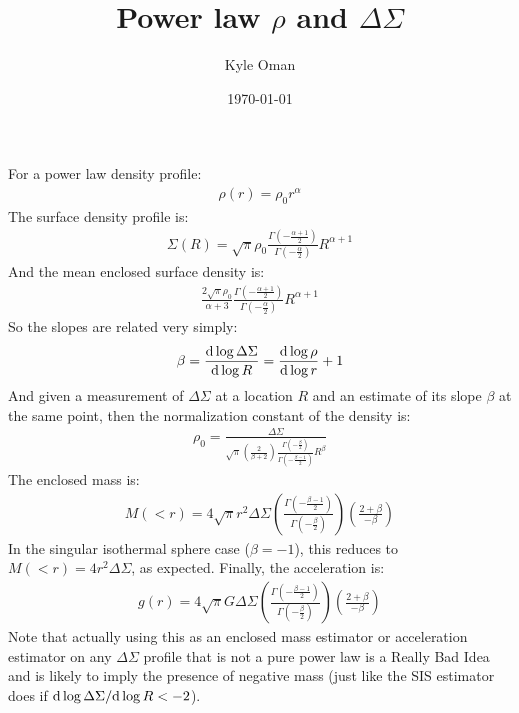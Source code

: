 \documentclass{article}
\title{Power law $\rho$ and $\Delta\Sigma$}
\author{Kyle Oman}
\date{\today}
\begin{document}
\maketitle

\noindent For a power law density profile:
\begin{align}
  \rho(r) = \rho_0 r^\alpha
\end{align}
The surface density profile is:
\begin{align}
  \Sigma(R) = \sqrt{\pi}\rho_0\frac{\Gamma\left(-\frac{\alpha+1}{2}\right)}{\Gamma\left(-\frac{\alpha}{2}\right)}R^{\alpha+1}
\end{align}
And the mean enclosed surface density is:
\begin{align}
  \frac{2\sqrt{\pi}\rho_0}{\alpha+3}\frac{\Gamma\left(-\frac{\alpha+1}{2}\right)}{\Gamma\left(-\frac{\alpha}{2}\right)}R^{\alpha+1}
\end{align}
So the slopes are related very simply:
\begin{align}
  \beta = \frac{{\rm d}\log\Delta\Sigma}{{\rm d}\log R} =  \frac{{\rm d}\log\rho}{{\rm d}\log r} + 1
\end{align}
And given a measurement of $\Delta\Sigma$ at a location $R$ and an estimate of its slope $\beta$ at the same point, then the normalization constant of the density is:
\begin{align}
  \rho_0 = \frac{\Delta\Sigma}{\sqrt{\pi}\left(\frac{2}{\beta+2}\right)\frac{\Gamma\left(-\frac{\beta}{2}\right)}{\Gamma\left(-\frac{\beta-1}{2}\right)}R^\beta}
\end{align}
The enclosed mass is:
\begin{align}
  M(<r) = 4\sqrt{\pi}r^2\Delta\Sigma\left(\frac{\Gamma\left(-\frac{\beta-1}{2}\right)}{\Gamma\left(-\frac{\beta}{2}\right)}\right)\left(\frac{2+\beta}{-\beta}\right)
\end{align}
In the singular isothermal sphere case ($\beta=-1$), this reduces to $M(<r)=4r^2\Delta\Sigma$, as expected. Finally, the acceleration is:
\begin{align}
  g(r) = 4\sqrt{\pi}G\Delta\Sigma\left(\frac{\Gamma\left(-\frac{\beta-1}{2}\right)}{\Gamma\left(-\frac{\beta}{2}\right)}\right)\left(\frac{2+\beta}{-\beta}\right)
\end{align}
Note that actually using this as an enclosed mass estimator or acceleration estimator on any $\Delta\Sigma$ profile that is not a pure power law is a Really Bad Idea and is likely to imply the presence of negative mass (just like the SIS estimator does if ${\rm d}\log\Delta\Sigma/{\rm d}\log R < -2$).
\end{document}
